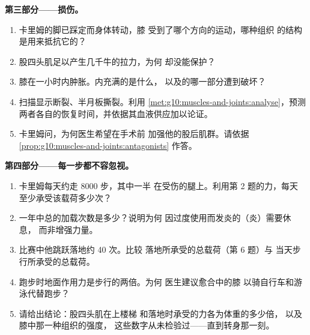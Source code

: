 \begin{problem}
\medskip
\noindent\textbf{第三部分——损伤。}
\begin{enumerate}[resume]
  \item 卡里姆的脚已踩定而身体转动，膝
        受到了哪个方向的运动，哪种组织
        的结构是用来抵抗它的？
  \item 股四头肌足以产生几千牛的拉力，为何
        却没能保护？
  \item 膝在一小时内肿胀。内充满的是什么，
        以及的哪一部分遭到破坏？
  \item 扫描显示断裂、半月板撕裂。利用
        \cref{met:g10:muscles-and-joints:analyse}，预测
        两者各自的恢复时间，并依据其血液供应加以论证。
  \item 卡里姆问，为何医生希望在手术前
        加强他的股后肌群。请依据
        \cref{prop:g10:muscles-and-joints:antagonists} 作答。
\end{enumerate}

\medskip
\noindent\textbf{第四部分——每一步都不容忽视。}
\begin{enumerate}[resume]
  \item 卡里姆每天约走 8000 步，其中一半
        在受伤的腿上。利用第 2 题的力，每天
        至少承受该载荷多少次？
  \item 一年中总的加载次数是多少？说明为何
        因过度使用而发炎的（炎）需要休息，
        而非增强力量。
  \item 比赛中他跳跃落地约 40 次。比较
        落地所承受的总载荷（第 6 题）与
        当天步行所承受的总载荷。
  \item 跑步时地面作用力是步行的两倍。为何
        医生建议愈合中的膝
        以骑自行车和游泳代替跑步？
  \item 请给出结论：股四头肌在上楼梯
        和落地时承受的力各为体重的多少倍，
        以及膝中那一种组织的强度，
        这些数字从未检验过——直到转身那一刻。
\end{enumerate}
\end{problem}
